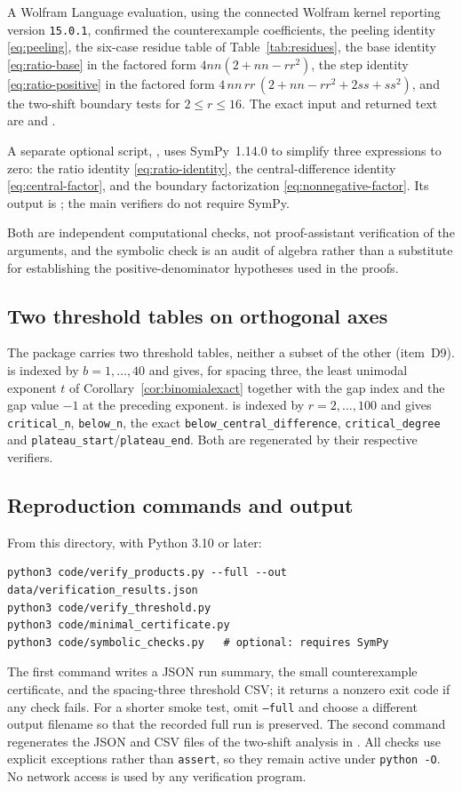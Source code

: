 \documentclass[11pt]{article}
\theoremstyle{research}
\theoremstyle{definition}
\numberwithin{equation}{section}
\begin{document}
A Wolfram Language evaluation, using the connected Wolfram kernel
reporting version \texttt{15.0.1}, confirmed the counterexample
coefficients, the peeling identity \eqref{eq:peeling}, the six-case
residue table of Table~\ref{tab:residues}, the base identity
\eqref{eq:ratio-base} in the factored form $4nn(2+nn-rr^2)$, the step
identity \eqref{eq:ratio-positive} in the factored form
$4\,nn\,rr\,(2+nn-rr^2+2ss+ss^2)$, and the two-shift boundary tests for
$2\le r\le16$. The exact input and returned text are
 and .

A separate optional script, , uses
SymPy~1.14.0 to simplify three expressions to zero: the ratio identity
\eqref{eq:ratio-identity}, the central-difference identity
\eqref{eq:central-factor}, and the boundary factorization
\eqref{eq:nonnegative-factor}. Its output is
; the main verifiers do not require
SymPy.

Both are independent computational checks, not proof-assistant
verification of the arguments, and the symbolic check is an audit of
algebra rather than a substitute for establishing the
positive-denominator hypotheses used in the proofs.

\subsection{Two threshold tables on orthogonal axes}
The package carries two threshold tables, neither a subset of the other
(item~D9).  is indexed by
$b=1,\ldots,40$ and gives, for spacing three, the least unimodal exponent
$t$ of Corollary~\ref{cor:binomialexact} together with the gap index and
the gap value $-1$ at the preceding exponent.
 is indexed by $r=2,\ldots,100$ and gives
\texttt{critical\_n}, \texttt{below\_n}, the exact
\texttt{below\_central\_difference}, \texttt{critical\_degree} and
\texttt{plateau\_start}/\texttt{plateau\_end}. Both are regenerated by
their respective verifiers.

\subsection{Reproduction commands and output}
From this directory, with Python 3.10 or later:
\begin{lstlisting}[language={}]
python3 code/verify_products.py --full --out data/verification_results.json
python3 code/verify_threshold.py
python3 code/minimal_certificate.py
python3 code/symbolic_checks.py   # optional: requires SymPy
\end{lstlisting}
The first command writes a JSON run summary, the small counterexample
certificate, and the spacing-three threshold CSV; it returns a nonzero exit
code if any check fails. For a shorter smoke test, omit \texttt{--full} and
choose a different output filename so that the recorded full run is
preserved. The second command regenerates the JSON and CSV files of the
two-shift analysis in . All checks use explicit exceptions
rather than \texttt{assert}, so they remain active under \texttt{python -O}.
No network access is used by any verification program.
\end{document}
